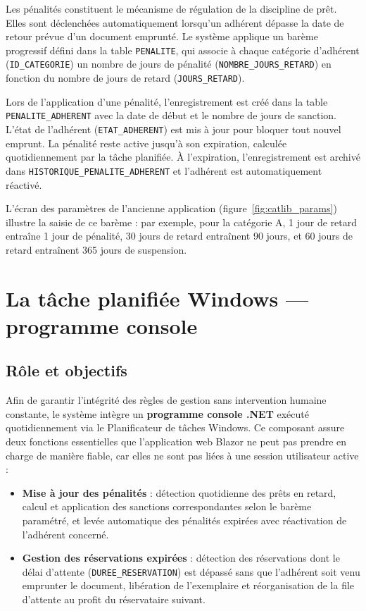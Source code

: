 Les pénalités constituent le mécanisme de régulation de la discipline de prêt.
Elles sont déclenchées automatiquement lorsqu'un adhérent dépasse la date de
retour prévue d'un document emprunté. Le système applique un barème progressif
défini dans la table \texttt{PENALITE}, qui associe à chaque catégorie
d'adhérent (\texttt{ID\_CATEGORIE}) un nombre de jours de pénalité
(\texttt{NOMBRE\_JOURS\_RETARD}) en fonction du nombre de jours de retard
(\texttt{JOURS\_RETARD}).

Lors de l'application d'une pénalité, l'enregistrement est créé dans la table
\texttt{PENALITE\_ADHERENT} avec la date de début et le nombre de jours de
sanction. L'état de l'adhérent (\texttt{ETAT\_ADHERENT}) est mis à jour pour
bloquer tout nouvel emprunt. La pénalité reste active jusqu'à son expiration,
calculée quotidiennement par la tâche planifiée. À l'expiration, l'enregistrement
est archivé dans \texttt{HISTORIQUE\_PENALITE\_ADHERENT} et l'adhérent est
automatiquement réactivé.

L'écran des paramètres de l'ancienne application (figure~\ref{fig:catlib_params})
illustre la saisie de ce barème : par exemple, pour la catégorie A, 1 jour de
retard entraîne 1 jour de pénalité, 30 jours de retard entraînent 90 jours,
et 60 jours de retard entraînent 365 jours de suspension.

\FloatBarrier

\section{La tâche planifiée Windows — programme console}
\label{sec:tache_planifiee}

\subsection{Rôle et objectifs}

Afin de garantir l'intégrité des règles de gestion sans intervention humaine
constante, le système intègre un \textbf{programme console .NET} exécuté
quotidiennement via le Planificateur de tâches Windows. Ce composant assure
deux fonctions essentielles que l'application web Blazor ne peut pas prendre
en charge de manière fiable, car elles ne sont pas liées à une session
utilisateur active :

\begin{itemize}
    \item \textbf{Mise à jour des pénalités} : détection quotidienne des prêts
    en retard, calcul et application des sanctions correspondantes selon le
    barème paramétré, et levée automatique des pénalités expirées avec
    réactivation de l'adhérent concerné.

    \item \textbf{Gestion des réservations expirées} : détection des réservations
    dont le délai d'attente (\texttt{DUREE\_RESERVATION}) est dépassé sans
    que l'adhérent soit venu emprunter le document, libération de l'exemplaire
    et réorganisation de la file d'attente au profit du réservataire suivant.
\end{itemize}


